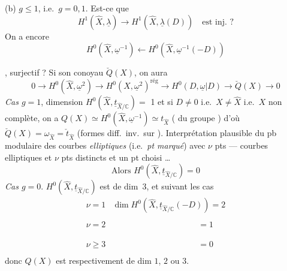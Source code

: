 \documentclass[11pt,a4paper]{article}
\begin{document}
(b) $g \leqslant 1$, i.e.\ $g = 0, 1$. Est-ce que
\[
H^{1}(\hat{X}, \underline{\lambda}) \longrightarrow H^{1}(\hat{X}, \underline{\lambda}(D)) \quad \text{est inj.\ ?}
\]
On a encore
\[
H^{0}(\hat{X}, \underline{\omega}^{-1}) \longleftarrow H^{0}(\hat{X}, \underline{\omega}^{-1}(-D))
\]

, surjectif ? Si son conoyau  $\check{Q}(X)$, on aura
\[
0 \to H^{0}(\hat{X}, \underline{\omega}^{2}) \to H^{0}(X, \underline{\omega}^{2})^{\mathrm{rég}} \to H^{0}(D, \underline{\omega}|D) \to \check{Q}(X) \to 0
\]
\emph{Cas $g = 1$},  dimension $H^{0}(\hat{X}, \underline{t}_{\hat{X}/\mathbb{C}}) =$ \struck{\ill{}} 1 et si $D \neq 0$ i.e.\ $X \neq \hat{X}$ i.e.\ $X$ non complète, on a $Q(X) \simeq H^{0}(\hat{X}, \underline{\omega}^{-1}) \simeq t_{\hat{X}}$ ( \struck{\ill{}} du groupe ) d'où $\check{Q}(X) = \omega_{\hat{X}} = \check{t}_{\hat{X}}$ (formes diff.\ inv.\ sur \uncertain{\ill{}}). Interprétation plausible   du pb modulaire des courbes \emph{elliptiques} (i.e.\ \emph{pt marqué}) avec $\nu$ pts  \emph{} \struck{\uncertain{\ill{}}}  — courbes elliptiques   \ill{} et $\nu$ pts   distincts et un pt choisi    … \struck{\ill{}}
\[
\text{Alors } H^{0}(\hat{X}, \underline{t}_{\hat{X}/\mathbb{C}}) = 0
\]
\emph{Cas $g = 0$}. $H^{0}(\hat{X}, \underline{t}_{\hat{X}/\mathbb{C}})$ est de dim~3, et suivant les cas
\[
\begin{array}{ll}
\nu = 1 & \dim H^{0}(\hat{X}, \underline{t}_{\hat{X}/\mathbb{C}}(-D)) = 2\\
\nu = 2 & \phantom{\dim H^{0}(\hat{X}, \underline{t}(-D))} = 1\\
\nu \geqslant 3 & \phantom{\dim H^{0}(\hat{X}, \underline{t}(-D))} = 0
\end{array}
\]
donc $Q(X)$ est respectivement de dim $1$, $2$ ou $3$.
\end{document}
